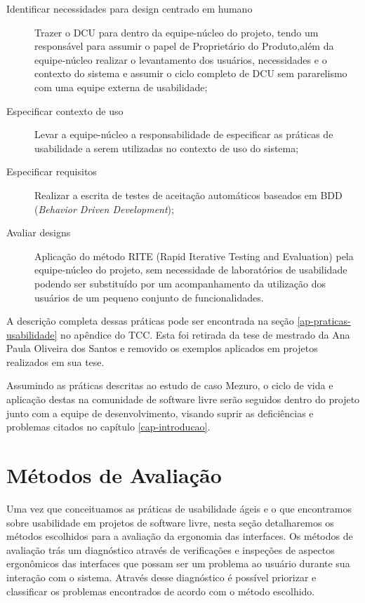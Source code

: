 \begin{description}
\item[Identificar necessidades para design centrado em humano] Trazer o DCU para dentro da equipe-núcleo do projeto, tendo um responsável para assumir o papel de Proprietário do Produto,além da equipe-núcleo realizar o levantamento dos usuários, necessidades e o contexto do sistema e assumir o ciclo completo de DCU sem pararelismo com uma equipe externa de usabilidade;
\item[Especificar contexto de uso] Levar a equipe-núcleo a responsabilidade de especificar as práticas de usabilidade a serem utilizadas no contexto de uso do sistema;
\item[Especificar requisitos] Realizar a escrita de testes de aceitação automáticos baseados em BDD (\textit{Behavior Driven Development});
\item[Avaliar designs] Aplicação do método RITE (Rapid Iterative Testing and Evaluation) pela equipe-núcleo do projeto, sem necessidade de laboratórios de usabilidade podendo ser substituído por um acompanhamento da utilização dos usuários de um pequeno conjunto de funcionalidades.
\end{description}

A descrição completa dessas práticas pode ser encontrada na seção \ref{ap-praticas-usabilidade} no apêndice do TCC. Esta foi retirada da tese de mestrado da Ana Paula Oliveira dos Santos e removido os exemplos aplicados em projetos realizados em sua tese. 

%
Assumindo as práticas descritas ao estudo de caso Mezuro, o ciclo de vida e aplicação destas na comunidade de software livre serão seguidos dentro do projeto junto com a equipe de desenvolvimento, visando suprir as deficiências e problemas citados no capítulo \ref{cap-introducao}.

\section{Métodos de Avaliação}
\label{metodos-avaliacao}

Uma  vez que conceituamos as práticas de usabilidade ágeis e o que 
encontramos sobre usabilidade em projetos de software livre, nesta seção
detalharemos os métodos escolhidos para a avaliação da ergonomia das interfaces. Os métodos de avaliação trás um diagnóstico através de verificações e inspeções de aspectos ergonômicos das interfaces que possam ser um problema ao usuário durante sua interação com o sistema. Através desse diagnóstico é possível priorizar e classificar os problemas encontrados de acordo com o método escolhido.

